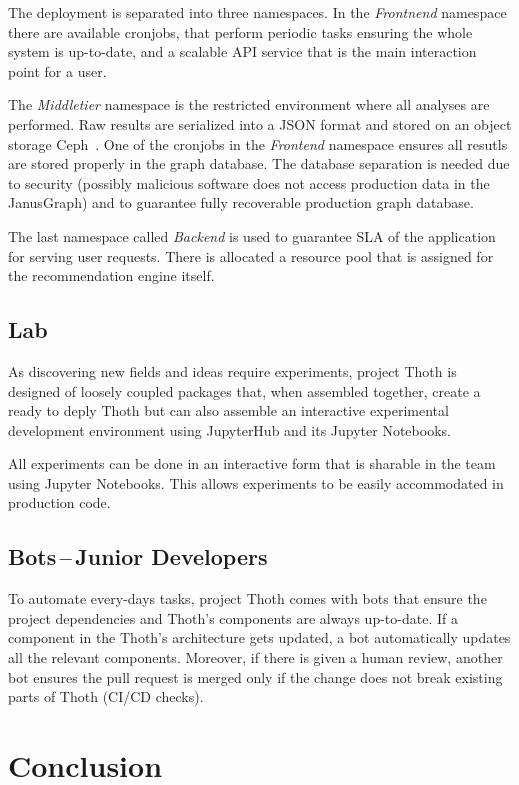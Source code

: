 \documentclass[a4paper]{llncs}
\begin{document}
The deployment is separated into three namespaces. In the \emph{Frontnend} namespace there are available cronjobs, that perform periodic tasks ensuring the whole system is up-to-date, and a scalable API service that is the main interaction point for a user.

The \emph{Middletier} namespace is the restricted environment where all analyses are performed. Raw results are serialized into a JSON format and stored on an object storage Ceph~\cite{ref_ceph}. One of the cronjobs in the \emph{Frontend} namespace ensures all resutls are stored properly in the graph database. The database separation is needed due to security (possibly malicious software does not access production data in the JanusGraph) and to guarantee fully recoverable production graph database.

The last namespace called \emph{Backend} is used to guarantee SLA of the application for serving user requests. There is allocated a resource pool that is assigned for the recommendation engine itself.

\subsection{Lab}

As discovering new fields and ideas require experiments, project Thoth is designed of loosely coupled packages that, when assembled together, create a ready to deply Thoth but can also assemble an interactive experimental development environment using JupyterHub and its Jupyter Notebooks.

All experiments can be done in an interactive form that is sharable in the team using Jupyter Notebooks. This allows experiments to be easily accommodated in production code.
\subsection{Bots\,--\,Junior Developers}

To automate every-days tasks, project Thoth comes with bots that ensure the project dependencies and Thoth's components are always up-to-date. If a component in the Thoth's architecture gets updated, a bot automatically updates all the relevant components. Moreover, if there is given a human review, another bot ensures the pull request is merged only if the change does not break existing parts of Thoth (CI/CD checks).

\section{Conclusion}
\end{document}
